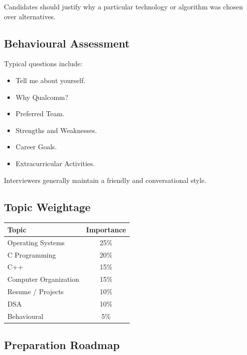 \documentclass[11pt,a4paper]{article}
\begin{document}
Candidates should justify why a particular technology or algorithm was chosen over alternatives.


\subsection{Behavioural Assessment}

Typical questions include:

\begin{itemize}
	\item Tell me about yourself.
	\item Why Qualcomm?
	\item Preferred Team.
	\item Strengths and Weaknesses.
	\item Career Goals.
	\item Extracurricular Activities.
\end{itemize}

Interviewers generally maintain a friendly and conversational style.


\subsection{Topic Weightage}

\begin{center}
	\begin{tabular}{|l|c|}
		\hline
		Topic & Importance \\
		\hline
		Operating Systems & 25\% \\
		C Programming & 20\% \\
		C++ & 15\% \\
		Computer Organization & 15\% \\
		Resume / Projects & 10\% \\
		DSA & 10\% \\
		Behavioural & 5\% \\
		\hline
	\end{tabular}
\end{center}


\subsection{Preparation Roadmap}
\end{document}
